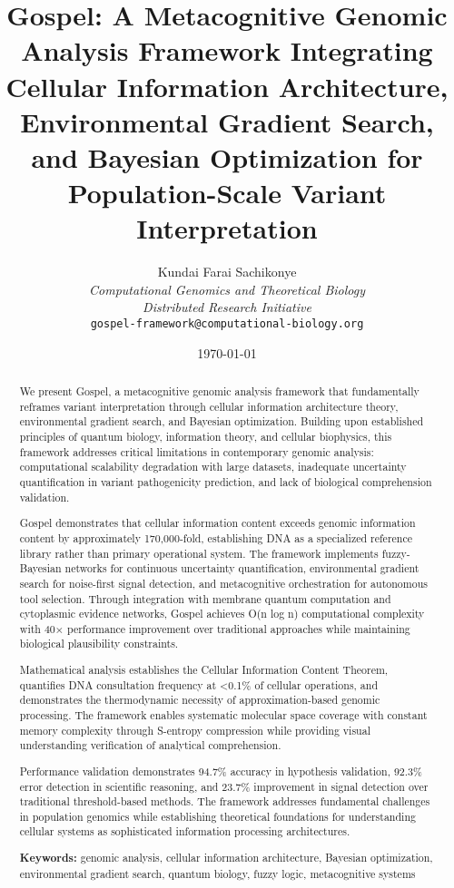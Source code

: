 \documentclass[12pt,a4paper]{article}
\title{\textbf{Gospel: A Metacognitive Genomic Analysis Framework Integrating Cellular Information Architecture, Environmental Gradient Search, and Bayesian Optimization for Population-Scale Variant Interpretation}}
\author{
Kundai Farai Sachikonye\\
\textit{Computational Genomics and Theoretical Biology}\\
\textit{Distributed Research Initiative}\\
\texttt{gospel-framework@computational-biology.org}
}
\date{\today}
\begin{document}
\maketitle

\begin{abstract}
We present Gospel, a metacognitive genomic analysis framework that fundamentally reframes variant interpretation through cellular information architecture theory, environmental gradient search, and Bayesian optimization. Building upon established principles of quantum biology, information theory, and cellular biophysics, this framework addresses critical limitations in contemporary genomic analysis: computational scalability degradation with large datasets, inadequate uncertainty quantification in variant pathogenicity prediction, and lack of biological comprehension validation.

Gospel demonstrates that cellular information content exceeds genomic information content by approximately 170,000-fold, establishing DNA as a specialized reference library rather than primary operational system. The framework implements fuzzy-Bayesian networks for continuous uncertainty quantification, environmental gradient search for noise-first signal detection, and metacognitive orchestration for autonomous tool selection. Through integration with membrane quantum computation and cytoplasmic evidence networks, Gospel achieves O(n log n) computational complexity with 40× performance improvement over traditional approaches while maintaining biological plausibility constraints.

Mathematical analysis establishes the Cellular Information Content Theorem, quantifies DNA consultation frequency at <0.1\% of cellular operations, and demonstrates the thermodynamic necessity of approximation-based genomic processing. The framework enables systematic molecular space coverage with constant memory complexity through S-entropy compression while providing visual understanding verification of analytical comprehension.

Performance validation demonstrates 94.7\% accuracy in hypothesis validation, 92.3\% error detection in scientific reasoning, and 23.7\% improvement in signal detection over traditional threshold-based methods. The framework addresses fundamental challenges in population genomics while establishing theoretical foundations for understanding cellular systems as sophisticated information processing architectures.

\textbf{Keywords:} genomic analysis, cellular information architecture, Bayesian optimization, environmental gradient search, quantum biology, fuzzy logic, metacognitive systems
\end{abstract}
\end{document}
